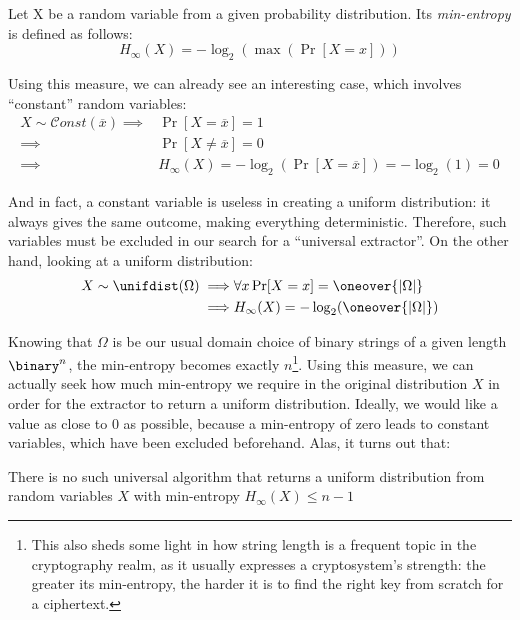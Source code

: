\begin{definition} Let X be a random variable from a given probability distribution. Its \emph{min-entropy} is defined as follows:
    \[
        H_{\infty}(X) = -\log_2(\max(\Pr[X = x]))
    \]
\end{definition}

Using this measure, we can already see an interesting case, which involves ``constant'' random variables:
\begin{align*}
    X \sim \mathcal{C}onst(\overline{x}) \implies & \Pr[X = \overline{x}] = 1                                       \\
    \implies                                      & \Pr[X \neq \overline{x}] = 0                                    \\
    \implies                                      & H_{\infty}(X) = -\log_2(\Pr[X = \overline{x}]) = -\log_2(1) = 0
\end{align*}

And in fact, a constant variable is useless in creating a uniform distribution: it always gives the same outcome, making everything deterministic. Therefore, such variables must be excluded in our search for a ``universal extractor''.
On the other hand, looking at a uniform distribution:
\begin{align*}
    X \sim \unifdist(\Omega) \implies & \forall x \Pr[X = x] = \oneover{|\Omega|}   \\
    \implies                          & H_{\infty}(X) = -\log_2(\oneover{|\Omega|})
\end{align*}

Knowing that $\Omega$ is be our usual domain choice of binary strings of a given length $\binary^n$, the min-entropy becomes exactly $n$\footnote{This also sheds some light in how string length is a frequent topic in the cryptography realm, as it usually expresses a cryptosystem's strength: the greater its min-entropy, the harder it is to find the right key from scratch for a ciphertext.}.
Using this measure, we can actually seek how much min-entropy we require in the original distribution $X$ in order for the extractor to return a uniform distribution. Ideally, we would like a value as close to 0 as possible, because a min-entropy of zero leads to constant variables, which have been excluded beforehand. Alas, it turns out that:
\begin{claim}
    There is no such universal \ext{} algorithm that returns a uniform distribution from random variables $X$ with min-entropy $H_{\infty}(X) \leq n - 1$
\end{claim}

